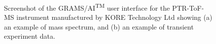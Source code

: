 


\begin{figure}%
\centering
{}

\caption{Screenshot of the GRAMS/AI\textsuperscript{TM} user interface for the PTR-ToF-MS instrument manufactured by KORE Technology Ltd showing (a) an example of mass spectrum, and (b) an example of transient experiment data.}
\label{fig:grams}
\end{figure}



